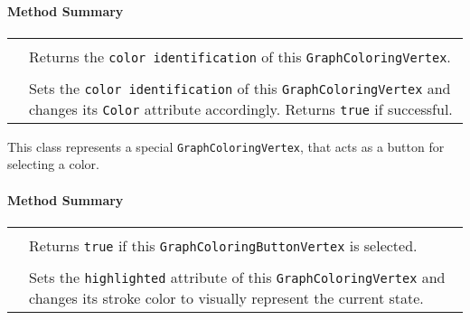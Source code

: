 
\centerdash

\paragraph*{Method Summary}
\paragraph*{}
\begin{longtable}{Lp{10cm}}
	\startmethodtable
	 \\
	& Returns the \texttt{color identification} of this \texttt{GraphColoringVertex}. \\
	 \\
	& Sets the \texttt{color identification} of this \texttt{GraphColoringVertex} and changes its \texttt{Color} attribute accordingly. Returns \texttt{true} if successful. \\
	
	\hline
\end{longtable}

\pagebreak

This class represents a special \texttt{GraphColoringVertex}, that acts as a button for selecting a color. \\ 

\centerdash

\paragraph*{Method Summary}
\paragraph*{}
\begin{longtable}{Lp{10cm}}
	\startmethodtable
	 \\
	& Returns \texttt{true} if this \texttt{GraphColoringButtonVertex} is selected. \\
	 \\
	& Sets the \texttt{highlighted} attribute of this \texttt{GraphColoringVertex} and changes its stroke color to visually represent the current state. \\
	\hline
\end{longtable}


